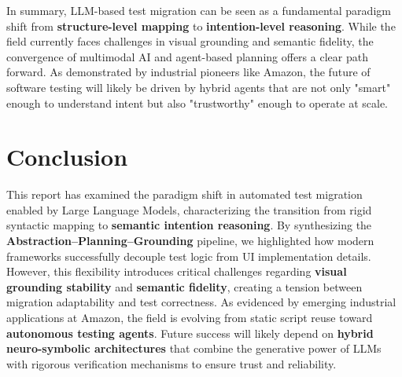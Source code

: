 \documentclass[acmsmall,nonacm]{acmart}
\begin{document}
In summary, LLM-based test migration can be seen as a fundamental paradigm shift from \textbf{structure-level mapping} to \textbf{intention-level reasoning}. While the field currently faces challenges in visual grounding and semantic fidelity, the convergence of multimodal AI and agent-based planning offers a clear path forward. As demonstrated by industrial pioneers like Amazon, the future of software testing will likely be driven by hybrid agents that are not only "smart" enough to understand intent but also "trustworthy" enough to operate at scale.


\section{Conclusion}
This report has examined the paradigm shift in automated test migration enabled by Large Language Models, characterizing the transition from rigid syntactic mapping to \textbf{semantic intention reasoning}. By synthesizing the \textbf{Abstraction–Planning–Grounding} pipeline, we highlighted how modern frameworks successfully decouple test logic from UI implementation details. However, this flexibility introduces critical challenges regarding \textbf{visual grounding stability} and \textbf{semantic fidelity}, creating a tension between migration adaptability and test correctness. As evidenced by emerging industrial applications at Amazon, the field is evolving from static script reuse toward \textbf{autonomous testing agents}. Future success will likely depend on \textbf{hybrid neuro-symbolic architectures} that combine the generative power of LLMs with rigorous verification mechanisms to ensure trust and reliability.



\end{document}

